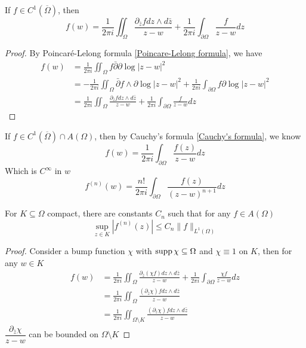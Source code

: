 \documentclass[../main.tex]{subfiles}
\begin{document}
\begin{theorem}\label{Cauchy's formula}
If $f\in C^1(\overline\Omega)$, then
\[f(w)=\frac{1}{2\pi i}\iint_{\Omega}\frac{\partial_{\bar z}f dz\wedge d\bar z}{z-w}+\frac{1}{2\pi i}\int_{\partial \Omega}\frac{f}{z-w}dz\]
\end{theorem}

\begin{proof}
By Poincar\'e-Lelong formula \ref{Poincare-Lelong formula}, we have
\begin{align*}
f(w)&=\frac{1}{2\pi i}\iint_\Omega f\bar\partial\partial\log|z-w|^2 \\
&=-\frac{1}{2\pi i}\iint_\Omega \bar\partial f\wedge\partial\log|z-w|^2 + \frac{1}{2\pi i}\int_{\partial \Omega}f\partial\log|z-w|^2 \\
&=\frac{1}{2\pi i}\iint_{\Omega}\frac{\partial_{\bar z}f dz\wedge d\bar z}{z-w}+\frac{1}{2\pi i}\int_{\partial \Omega}\frac{f}{z-w}dz
\end{align*}
\end{proof}

\begin{corollary}
If $f\in C^1(\overline\Omega)\cap A(\Omega)$, then by Cauchy's formula \ref{Cauchy's formula}, we know
\[f(w)=\frac{1}{2\pi i}\int_{\partial \Omega}\frac{f(z)}{z-w}dz\]
Which is $C^\infty$ in $w$
\[f^{(n)}(w)=\frac{n!}{2\pi i}\int_{\partial \Omega}\frac{f(z)}{(z-w)^{n+1}}dz\]
\end{corollary}

\begin{corollary}\label{Cauchy's estimate}
For $K\subseteq\Omega$ compact, there are constants $C_n$ such that for any $f\in A(\Omega)$
\[\sup_{z\in K}|f^{(n)}(z)|\leq C_n\|f\|_{L^1(\Omega)}\]
\end{corollary}

\begin{proof}
Consider a bump function $\chi$ with $\operatorname{supp}\chi\subseteq\Omega$ and $\chi\equiv1$ on $K$, then for any $w\in K$
\begin{align*}
f(w)&=\frac{1}{2\pi i}\iint_{\Omega}\frac{\partial_{\bar z}(\chi f) dz\wedge d\bar z}{z-w}+\frac{1}{2\pi i}\int_{\partial \Omega}\frac{\chi f}{z-w}dz \\
&=\frac{1}{2\pi i}\iint_{\Omega}\frac{(\partial_{\bar z}\chi) f dz\wedge d\bar z}{z-w} \\
&=\frac{1}{2\pi i}\iint_{\Omega\setminus K}\frac{(\partial_{\bar z}\chi) f dz\wedge d\bar z}{z-w}
\end{align*}
$\dfrac{\partial_{\bar z}\chi}{z-w}$ can be bounded on $\Omega\setminus K$
\end{proof}
\end{document}
